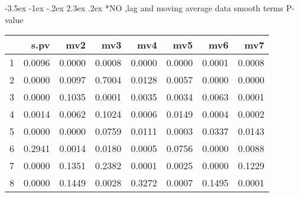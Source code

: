 \documentclass[a4paper, 12pt]{article}
\makeatletter
\def\Large{\fontsize{16}{24}\selectfont}
\renewcommand\section{\@startsection {section}{1}{\z@}%
                                   {-3.5ex \@plus -1ex \@minus -.2ex}%
                                   {2.3ex \@plus.2ex}%
                                   {\centering\normalfont\Large\bfseries}}
\makeatother
\begin{document}
\section*{NO ,lag and moving average data}
smooth terms P-value
\begin{table}[ht]
\centering
\begin{tabular}{rrrrrrrr}
  \hline
 & s.pv & mv2 & mv3 & mv4 & mv5 & mv6 & mv7 \\
  \hline
1 & 0.0096 & 0.0000 & 0.0008 & 0.0000 & 0.0000 & 0.0001 & 0.0008 \\
  2 & 0.0000 & 0.0097 & 0.7004 & 0.0128 & 0.0057 & 0.0000 & 0.0000 \\
  3 & 0.0000 & 0.1035 & 0.0001 & 0.0035 & 0.0034 & 0.0063 & 0.0001 \\
  4 & 0.0014 & 0.0062 & 0.1024 & 0.0006 & 0.0149 & 0.0004 & 0.0002 \\
  5 & 0.0000 & 0.0000 & 0.0759 & 0.0111 & 0.0003 & 0.0337 & 0.0143 \\
  6 & 0.2941 & 0.0014 & 0.0180 & 0.0005 & 0.0756 & 0.0000 & 0.0088 \\
  7 & 0.0000 & 0.1351 & 0.2382 & 0.0001 & 0.0025 & 0.0000 & 0.1229 \\
  8 & 0.0000 & 0.1449 & 0.0028 & 0.3272 & 0.0007 & 0.1495 & 0.0001 \\
   \hline
\end{tabular}
\end{table}
\end{document}
